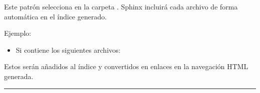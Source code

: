 \documentclass[a4paper,10pt,oneside,spanish,openany]{sphinxmanual}
\begin{document}
\begin{itemize}
\begin{itemize}
\begin{itemize}
\begin{enumerate}
\begin{itemize}
\end{itemize}

\end{enumerate}

\begin{sphinxVerbatim}[commandchars=\\\{\}]
\end{sphinxVerbatim}

\sphinxAtStartPar
Este patrón selecciona  en la carpeta .
Sphinx incluirá cada archivo de forma automática en el índice generado.

\sphinxAtStartPar
Ejemplo:
\begin{itemize}
\item {} 
\sphinxAtStartPar
Si  contiene los siguientes archivos:

\end{itemize}

\begin{sphinxVerbatim}[commandchars=\\\{\}]
\end{sphinxVerbatim}

\sphinxAtStartPar
Estos serán añadidos al índice y convertidos en enlaces en la navegación HTML generada.

\end{itemize}

\end{itemize}

\end{itemize}


\bigskip\hrule\bigskip
\end{document}
